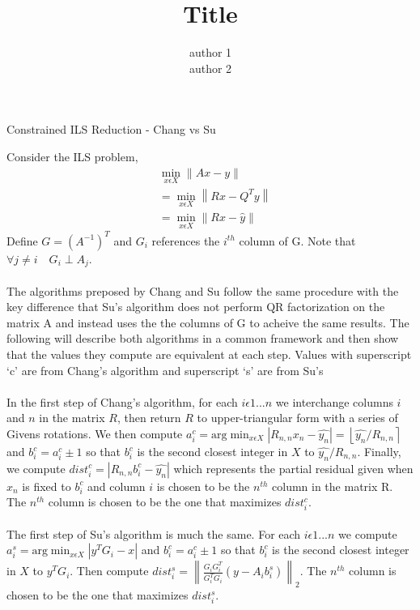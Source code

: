 \documentclass[11pt]{article}	%
\author{author 1\\ author 2}
\title{Title}
\numberwithin{algorithm}{section}
\begin{document}
\begin{center}\begin{large}Constrained ILS Reduction - Chang vs Su\end{large}\end{center}
Consider the ILS problem, 
\begin{align*}
&\min_{x\epsilon X}\left \| Ax-y \right \|\\
&=\min_{x\epsilon X}\left \| Rx-Q^Ty \right \|\\
&=\min_{x\epsilon X}\left \| Rx-\hat{y} \right \|
\end{align*}
Define $G=(A^{-1})^T$ and $G_i$ references the $i^{th}$ column of G. Note that $\forall{j\neq i}\quad G_i \perp A_j$. \\\\

The algorithms preposed by Chang and Su follow the same procedure with the key difference that Su's algorithm does not perform QR factorization on the matrix A and instead uses the the columns of G to acheive the same results. The following will describe both algorithms in a common framework and then show that the values they compute are equivalent at each step. Values with superscript `c' are from Chang's algorithm and superscript `s' are from Su's\\\\

In the first step of Chang's algorithm, for each $i\epsilon 1...n$ we interchange columns $i$ and $n$ in the matrix $R$, then return $R$ to upper-triangular form with a series of Givens rotations. We then compute $a_i^c=\textrm{arg}\min_{x\epsilon X}\left | R_{n,n}x_n - \hat{y_n} \right | = \left \lfloor\hat{y_n}/R_{n,n}\right \rceil$ and $b_i^c = a_i^c \pm 1$ so that $b_i^c$ is the second closest integer in $X$ to $\hat{y_n}/R_{n,n}$. Finally, we compute $dist_i^c = \left | R_{n,n}b_i^c - \hat{y_n} \right |$ which represents the partial residual given when $x_n$ is fixed to $b_i^c$ and column $i$ is chosen to be the $n^{th}$ column in the matrix R. The $n^{th}$ column is chosen to be the one that maximizes $dist_i^c$.\\\\

The first step of Su's algorithm is much the same. For each $i\epsilon 1...n$ we compute $a_i^s = \textrm{arg}\min_{x\epsilon X}\left | y^TG_i - x \right |$ and $b_i^c = a_i^c \pm 1$ so that $b_i^c$ is the second closest integer in $X$ to $y^TG_i$. Then compute $dist_i^s = \left \| \frac{G_iG_i^T}{G_i^TG_i}(y-A_ib_i^s) \right \|_2$. The $n^{th}$ column is chosen to be the one that maximizes $dist_i^s$.\\\\
\end{document}
